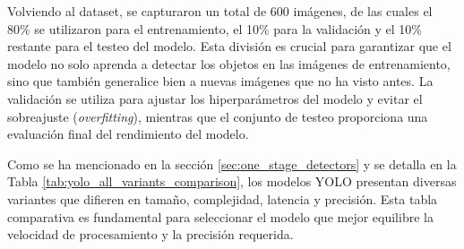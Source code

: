 \documentclass[11pt,spanish,listoffigures,listoftables]{tfgetsinf}
\begin{document}
Volviendo al dataset, se capturaron un total de 600 imágenes, de las cuales el 80\% se utilizaron para el entrenamiento, el 10\% para la validación y el 10\% restante para el testeo del modelo. Esta división es crucial para garantizar que el modelo no solo aprenda a detectar los objetos en las imágenes de entrenamiento, sino que también generalice bien a nuevas imágenes que no ha visto antes. La validación se utiliza para ajustar los hiperparámetros del modelo y evitar el sobreajuste (\textit{overfitting}), mientras que el conjunto de testeo proporciona una evaluación final del rendimiento del modelo.


Como se ha mencionado en la sección \ref{sec:one_stage_detectors} y se detalla en la Tabla \ref{tab:yolo_all_variants_comparison}, los modelos YOLO presentan diversas variantes que difieren en tamaño, complejidad, latencia y precisión. Esta tabla comparativa es fundamental para seleccionar el modelo que mejor equilibre la velocidad de procesamiento y la precisión requerida.
\end{document}
